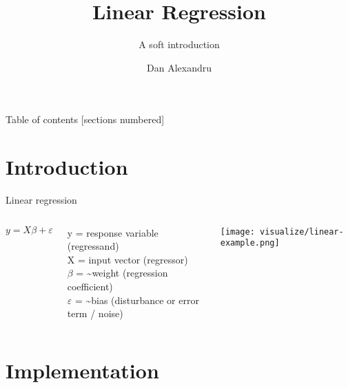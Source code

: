 \documentclass[10pt]{beamer}
\title{Linear Regression}
\subtitle{A soft introduction}
\date{}
\author{Dan Alexandru}
\begin{document}
\maketitle

\begin{frame}{Table of contents}
  [sections numbered]
  \tableofcontents[hideallsubsections]
\end{frame}

\section{Introduction}

\begin{frame}{Linear regression}
\begin{columns}[T,onlytextwidth]
     \begin{equation*}
        y = X\beta+\varepsilon
      \end{equation*}
      
        y = response variable (regressand) \\
        X = input vector (regressor) \\
        $\beta$ = \textasciitilde weight (regression coefficient)\\
        $\varepsilon$ = \textasciitilde bias (disturbance or error term / noise) 

    \begin{center}\texttt{[image: visualize/linear-example.png]}\end{center}
\end{columns}
\end{frame}

\section{Implementation}
\end{document}
